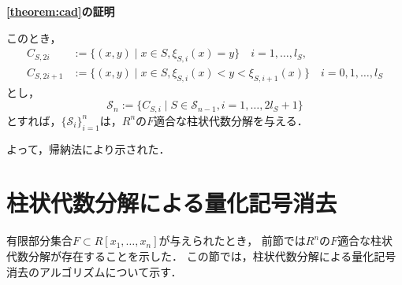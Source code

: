 \documentclass[uplatex, dvipdfmx]{jsarticle}
\makeatletter
\numberwithin{equation}{section}
\renewenvironment{proof}[1][\proofname]{\par
  \pushQED{\qed}%
  \normalfont \topsep6\p@\@plus6\p@\relax
  \trivlist
  \item\relax
  {\bfseries
  #1\@addpunct{.}}\hspace\labelsep\ignorespaces
}{
  \popQED\endtrivlist\@endpefalse
}
\newcommand{\R}{\mathbb{R}}
\newcommand{\calS}{\mathcal{S}}
\theoremstyle{definition}
\newtheorem{definition}{定義}[section]
\renewcommand{\proofname}{\textbf{証明}}
\makeatother
\begin{document}
\begin{proof}[\cref{theorem:cad}の証明]
     このとき，
     \begin{align}
          C_{S,2i} &:= \{(x,y) \mid  x \in S, \xi_{S,i}(x) = y \} \quad i = 1,\dots, l_S,\\
          C_{S,2i+1} &:= \{(x,y) \mid x \in S, \xi_{S,i}(x)<y<\xi_{S,i+1}(x) \} \quad i = 0,1, \dots, l_S 
     \end{align}
     とし，
     \begin{equation}
          \calS_n := \{C_{S,i} \mid S \in \calS_{n-1}, i=1, \dots, 2l_S+1\}
     \end{equation}
     とすれば，$\{\calS_i\}_{i=1}^n$は，$R^n$の$F$適合な柱状代数分解を与える．

     よって，帰納法により示された．
\end{proof}




\section{柱状代数分解による量化記号消去}

有限部分集合$F \subset R[x_1, \dots, x_n]$が与えられたとき，
前節では$R^n$の$F$適合な柱状代数分解が存在することを示した．
この節では，柱状代数分解による量化記号消去のアルゴリズムについて示す．
\end{document}
